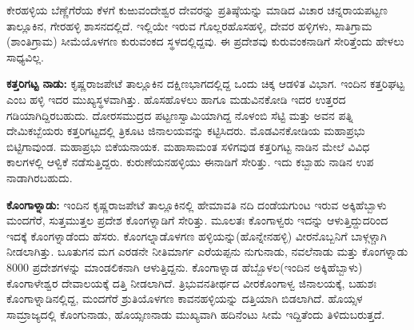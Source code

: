 ಕೇರಹಳ್ಳಿಯ ಬೆಣ್ಣೆಗೆರೆಯ ಕೆಳಗೆ ಕುಱುವಂದೇಶ್ವರ ದೇವರನ್ನು ಪ್ರತಿಷ್ಠೆಯನ್ನು ಮಾಡಿದ ವಿಚಾರ ಚನ್ನರಾಯಪಟ್ಟಣ ತಾಲ್ಲೂಕಿನ, ಗೇರಹಳ್ಳಿ ಶಾಸನದಲ್ಲಿದೆ. ಇಲ್ಲಿಯೇ ಇರುವ ಗೊಲ್ಲರಹೊಸಹಳ್ಳಿ, ದೇವರ ಹಳ್ಳಿಗಳು, ಸಾತಿಗ್ರಾಮ (ಶಾಂತಿಗ್ರಾಮ) ಸೀಮೆಯೊಳಗಣ ಕುರುವಂಕದ ಸ್ಥಳದಲ್ಲಿದ್ದವು. ಈ ಪ್ರದೇಶವು ಕುರುವಂಕನಾಡಿಗೆ ಸೇರಿತ್ತೆಂದು ಹೇಳಲು ಸಾಧ್ಯವಿಲ್ಲ.

\textbf{ಕತ್ತರಿಗಟ್ಟ ನಾಡು:} ಕೃಷ್ಣರಾಜಪೇಟೆ ತಾಲ್ಲೂಕಿನ ದಕ್ಷಿಣಭಾಗದಲ್ಲಿದ್ದ ಒಂದು ಚಿಕ್ಕ ಆಡಳಿತ ವಿಭಾಗ. ಇಂದಿನ ಕತ್ತರಿಘಟ್ಟ ಎಂಬ ಹಳ್ಳಿ ಇದರ ಮುಖ್ಯಸ್ಥಳವಾಗಿತ್ತು. ಹೊಸಹೊಳಲು ಹಾಗೂ ಮಡುವಿನಕೋಡಿ ಇದರ ಉತ್ತರದ ಗಡಿಯಾಗಿದ್ದಿರಬಹುದು. ದೋರಸಮುದ್ರದ ಪಟ್ಟಣಸ್ವಾಮಿಯಾಗಿದ್ದ ನೊಳಂಬಿ ಸೆಟ್ಟಿ ಮತ್ತು ಅವನ ಪತ್ನಿ ದೇಮಿಕಬ್ಬೆಯರು ಕತ್ತರಿಗಟ್ಟದಲ್ಲಿ ತ್ರಿಕೂಟ ಜಿನಾಲಯವನ್ನು ಕಟ್ಟಿಸಿದರು. ಮೊಡವಿನಕೋಡಿಯ ಮಹಾಪ್ರಭು ಬಿಟ್ಟಿಗಾವುಂಡ. ಮಹಾಪ್ರಭು ಬಿಕೆಯನಾಯಕ. ಮಹಾಸಾಮಂತ ಸಳಿಗವುಡ ಕತ್ತರಿಗಟ್ಟ ನಾಡಿನ ಮೇಲೆ ವಿವಿಧ ಕಾಲಗಳಲ್ಲಿ ಆಳ್ವಿಕೆ ನಡೆಸುತ್ತಿದ್ದರು. ಕುರುಣೆಯನಹಳ್ಳಿಯು ಈ\break ನಾಡಿಗೆ ಸೇರಿತ್ತು. ಇದು ಕಬ್ಬಾಹು ನಾಡಿನ ಉಪ ನಾಡಾಗಿರಬಹುದು.

\textbf{ಕೊಂಗಾಳ್ನಾಡು:} ಇಂದಿನ ಕೃಷ್ಣರಾಜಪೇಟೆ ತಾಲ್ಲೂಕಿನಲ್ಲಿ ಹೇಮಾವತಿ ನದಿ ದಂಡೆಯಗುಂಟ ಇರುವ ಅಕ್ಕಿಹೆಬ್ಬಾಳು ಮಂದಗೆರೆ, ಸುತ್ತಮುತ್ತಲ ಪ್ರದೇಶ ಕೊಂಗಳ್ನಾಡಿಗೆ ಸೇರಿತ್ತು. ಮೂಲತಃ ಕೊಂಗಾಳ್ವರು ಇದನ್ನು ಆಳುತ್ತಿದ್ದುದರಿಂದ ಇದಕ್ಕೆ ಕೊಂಗಳ್ನಾಡೆಂದು ಹೆಸರು. ಕೊಂಗಲ್ನಾಡೊಳಗಣ ಹಳ್ಳಿಯನ್ನು(ಹೊನ್ನೇನಹಳ್ಳಿ) ವೀರನೊಬ್ಬನಿಗೆ ಬಾಳ್ಗಳ್ಚಾಗಿ ನೀಡಲಾಗಿತ್ತು. ಬೂತುಗನ ಮಗ ಎರಡನೇ ನೀತಿಮಾರ್ಗ ಎರೆಯಪ್ಪನು ನುಗುನಾಡು, ನವಲೆನಾಡು ಮತ್ತು ಕೊಂಗಳ್ನಾಡು 8000 ಪ್ರದೇಶಗಳನ್ನು ಮಾಂಡಲಿಕನಾಗಿ ಆಳುತ್ತಿದ್ದನು. ಕೊಂಗಾಳ್ನಾಡ ಹೆಬ್ಬೊಳಲ(ಇಂದಿನ ಅಕ್ಕಿಹೆಬ್ಬಾಳು) ಕೊಂಗಾಳೇಶ್ವರ ದೇವಾಲಯಕ್ಕೆ ದತ್ತಿ ನೀಡಲಾಗಿದೆ. ತ್ರಿಭುವನತೀರ್ಥದ ವೀರಕೊಂಗಾಳ್ವ ಜಿನಾಲಯಕ್ಕೆ, ಬಹುಶಃ ಕೊಂಗಾಳ್ನಾಡಿನಲ್ಲಿದ್ದ, ಮಂದಗೆರೆ ಶ್ರುತಿಯೊಳಗಣ ಕಾವನಹಳ್ಳಿಯನ್ನು ದತ್ತಿಯಾಗಿ ಬಿಡಲಾಗಿದೆ. ಹೊಯ್ಸಳ ಸಾಮ್ರಾಜ್ಯದಲ್ಲಿ ಕೊಂಗುನಾಡು, ಹೊಯ್ಸಣನಾಡು ಮುಖ್ಯವಾಗಿ ಹದಿನೆಂಟು ಸೀಮೆ ಇದ್ದಿತೆಂದು ತಿಳಿದುಬರುತ್ತದೆ.

